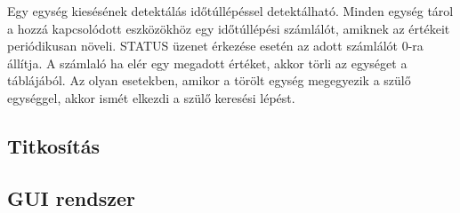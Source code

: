 Egy egység kiesésének detektálás időtúllépéssel detektálható. Minden egység tárol a hozzá kapcsolódott eszközökhöz egy időtúllépési számlálót, amiknek az értékeit periódikusan növeli. STATUS üzenet érkezése esetén az adott számlálót 0-ra állítja. A számlaló ha elér egy megadott értéket, akkor törli az egységet a táblájából. Az olyan esetekben, amikor a törölt egység megegyezik a szülő egységgel, akkor ismét elkezdi a szülő keresési lépést.


\subsection{Titkosítás}
\subsection{GUI rendszer}